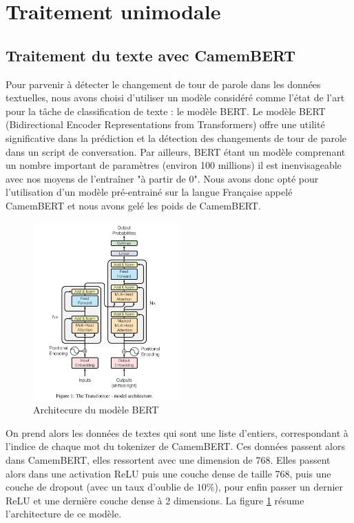 \documentclass[a4paper]{article}
\begin{document}
\section{Traitement unimodale}

\subsection{Traitement du texte avec CamemBERT}

Pour parvenir à détecter le changement de tour de parole dans les données textuelles, nous avons choisi d'utiliser un modèle considéré comme l'état de l'art pour la tâche de classification de texte : le modèle BERT. Le modèle BERT (Bidirectional Encoder Representations from Transformers) offre une utilité significative dans la prédiction et la détection des changements de tour de parole dans un script de conversation.
Par ailleurs, BERT étant un modèle comprenant un nombre important de paramètres (environ 100 millions) il est inenvisageable avec nos moyens de l'entraîner "à partir de 0". Nous avons donc opté pour l'utilisation d'un modèle pré-entrainé sur la langue Française appelé CamemBERT et nous avons gelé les poids de CamemBERT.\newline

\begin{figure}[H]
    \centering
    \includegraphics[width=0.5\textwidth]{BERT.png}
    \caption{Architecure du modèle BERT}
    \label{fig: model_text} 
\end{figure}



On prend alors les données de textes qui sont une liste d'entiers, correspondant 
à l'indice de chaque mot du tokenizer de CamemBERT. Ces données passent alors dans CamemBERT, elles ressortent avec une dimension de 768. Elles passent alors dans une activation ReLU puis une couche dense de taille 768, puis une couche de dropout (avec un taux d'oublie de $10\%$), pour enfin passer un dernier ReLU et une dernière couche dense à 2 dimensions. 
La figure \ref{fig: model_text} résume l'architecture de ce modèle.
\end{document}
